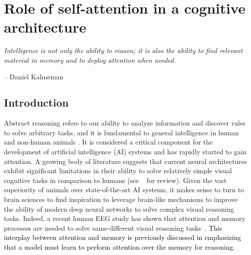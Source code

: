 \chapter{Role of self-attention in a cognitive architecture}
\label{chapter2b}
%

\startcontents[chapters]
\printmyminitoc

\epigraph{\itshape  Intelligence is not only the ability to reason; it is also the ability to find relevant material in memory and to deploy attention when needed.}{-- Daniel Kahneman}

\section{Introduction}
\label{sec:introc2}

Abstract reasoning refers to our ability to analyze information and discover rules to solve arbitrary tasks, and it is  fundamental to general intelligence in human and non-human animals \citep{gentner1997structure,lovett2017modeling}. It is considered a critical component for the development of artificial intelligence (AI) systems and has rapidly started to gain attention. A growing body of literature suggests that current neural architectures exhibit significant limitations in their ability to solve relatively simple visual cognitive tasks in comparison to humans (see ~\citet{ricci37same} for review). 
Given the vast superiority of animals over state-of-the-art AI systems, it makes sense to turn to brain sciences to find inspiration to leverage brain-like mechanisms to improve the ability of  modern deep neural networks  to solve complex visual reasoning tasks. Indeed, a recent human EEG study has shown that attention and memory processes are needed to solve same-different visual reasoning tasks~\citep{alamia2021differential}. \textcolor{black}{This interplay between attention and memory is previously discussed in \citet{buehner2006cognitive,fougnie2008relationship,cochrane2019fluid} emphasizing that a model must learn to perform attention over the memory for reasoning.}

